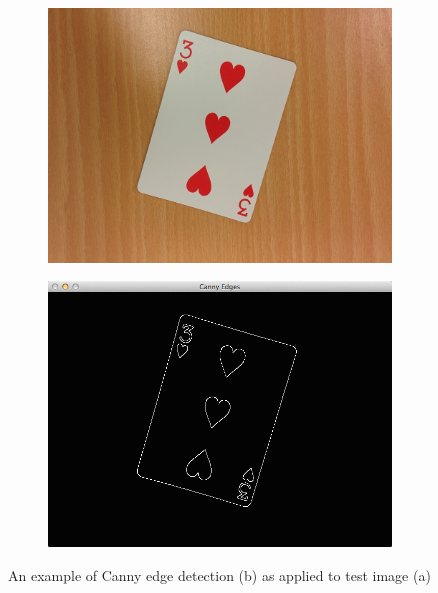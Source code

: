 \documentclass[a4paper,12pt,notitlepage]{article}
\begin{document}
			\begin{figure}[H]
				\centering
				\begin{subfigure}[b]{0.6\textwidth}
					\centering
					\includegraphics[width=\textwidth]{numtopred}
					\caption{}
				\end{subfigure}
			\end{figure}
			\begin{figure}[H]
				\ContinuedFloat
				\centering
				\begin{subfigure}[b]{0.6\textwidth}
					\centering
					\includegraphics[width=\textwidth]{canny}
					\caption{}
				\end{subfigure}
				\caption{An example of Canny edge detection (b) as applied to test image (a)}
				\label{fig:cannyimg}
			\end{figure}
\end{document}
